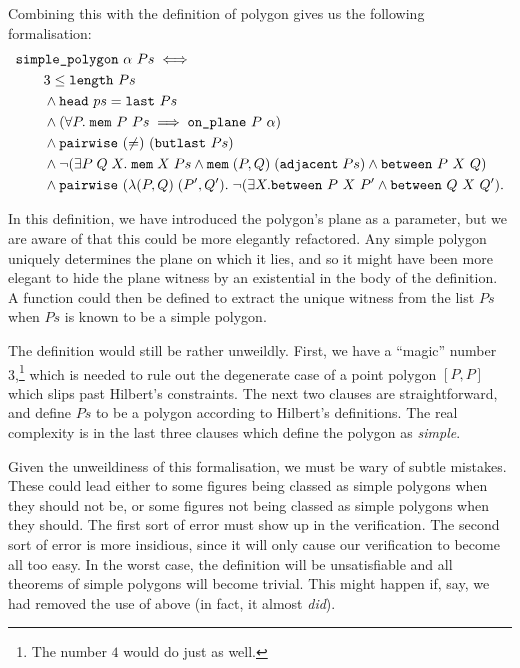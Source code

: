 Combining this with the definition of polygon gives us the following formalisation:
\begin{equation}\label{eq:SimplePolygonDef}
  \begin{split}
    &\code{simple\_polygon}\ \alpha\ Ps \iff \\
    &\qquad 3 \leq \code{length}\ Ps\\
    &\qquad\wedge \code{head}\ ps = \code{last}\ Ps\\
    &\qquad\wedge (\forall P.\;\code{mem}\ P\ Ps \implies \code{on\_plane}\ P\ \alpha)\\
    &\qquad\wedge \code{pairwise}\ (\neq)\ (\code{butlast}\ Ps)\\
    &\qquad\wedge \neg(\exists P\;Q\;X.\; \code{mem}\;X\;Ps\wedge\code{mem}\;(P,Q)\;(\code{adjacent}\;Ps)\wedge\between{P}{X}{Q})\\
    &\qquad\wedge \code{pairwise}\ (\lambda(P,Q)\;(P',Q').\;\neg(\exists X. \between{P}{X}{P'} \wedge \between{Q}{X}{Q'}).
  \end{split}
\end{equation}

In this definition, we have introduced the polygon's plane as a parameter, but we are aware of that this could be more elegantly refactored. Any simple polygon uniquely determines the plane on which it lies, and so it might have been more elegant to hide the plane witness by an existential in the body of the definition. A function could then be defined to extract the unique witness from the list $Ps$ when $Ps$ is known to be a simple polygon. 

The definition would still be rather unweildly. First, we have a ``magic'' number 3,\footnote{The number $4$ would do just as well.} which is needed to rule out the degenerate case of a point polygon $[P,P]$ which slips past Hilbert's constraints. The next two clauses are straightforward, and define $Ps$ to be a polygon according to Hilbert's definitions. The real complexity is in the last three clauses which define the polygon as \emph{simple}. 

Given the unweildiness of this formalisation, we must be wary of subtle mistakes. These could lead either to some figures being classed as simple polygons when they should not be, or some figures not being classed as simple polygons when they should. The first sort of error must show up in the verification. The second sort of error is more insidious, since it will only cause our verification to become all too easy. In the worst case, the definition will be unsatisfiable and all theorems of simple polygons will become trivial. This might happen if, say, we had removed the use of  above (in fact, it almost \emph{did}).

